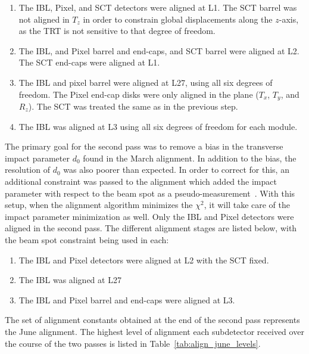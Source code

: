 \begin{enumerate}
\item The IBL, Pixel, and SCT detectors were aligned at L1.  The SCT barrel was not aligned in $T_z$ in order to constrain global displacements along the $z$-axis, as the TRT is not sensitive to that degree of freedom.
\item The IBL, and Pixel barrel and end-caps, and SCT barrel were aligned at L2.  The SCT end-caps were aligned at L1.
\item The IBL and pixel barrel were aligned at L27, using all six degrees of freedom.  The Pixel end-cap disks were only aligned in the plane ($T_x$, $T_y$, and $R_z$).  The SCT was treated the same as in the previous step.
\item The IBL was aligned at L3 using all six degrees of freedom for each module.
\end{enumerate}

The primary goal for the second pass was to remove a bias in the transverse impact parameter $d_0$ found in the March alignment.
In addition to the bias, the resolution of $d_0$ was also poorer than expected.
In order to correct for this, an additional constraint was passed to the alignment which added the impact parameter with respect to the beam spot as a pseudo-measurement~\cite{2014.alignment-framework}.
With this setup, when the alignment algorithm minimizes the $\chi^2$, it will take care of the impact parameter minimization as well.
Only the IBL and Pixel detectors were aligned in the second pass.
The different alignment stages are listed below, with the beam spot constraint being used in each:
\begin{enumerate}
\item The IBL and Pixel detectors were aligned at L2 with the SCT fixed.
\item The IBL was aligned at L27
\item The IBL and Pixel barrel and end-caps were aligned at L3.
\end{enumerate}
The set of alignment constants obtained at the end of the second pass represents the June alignment.
The highest level of alignment each subdetector received over the course of the two passes is listed in Table~\ref{tab:align_june_levels}.

